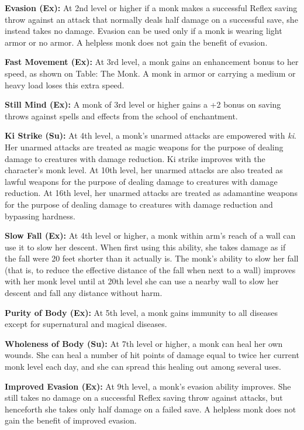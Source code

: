 \textbf{Evasion (Ex):} At 2nd level or higher if a monk makes a successful Reflex 
saving throw against an attack that normally deals half damage on a successful 
save, she instead takes no damage. Evasion can be used only if a monk is wearing 
light armor or no armor. A helpless monk does not gain the benefit of evasion.

\textbf{Fast Movement (Ex):} At 3rd level, a monk gains an enhancement bonus to 
her speed, as shown on Table: The Monk. A monk in armor or carrying a medium or 
heavy load loses this extra speed.

\textbf{Still Mind (Ex):} A monk of 3rd level or higher gains a +2 bonus on saving 
throws against spells and effects from the school of enchantment.

\textbf{Ki Strike (Su):} At 4th level, a monk's unarmed attacks 
are empowered with \textit{ki}. Her unarmed attacks are treated as magic weapons 
for the purpose of dealing damage to creatures with damage reduction. Ki 
strike improves with the character's monk level. At 10th level, her unarmed attacks 
are also treated as lawful weapons for the purpose of dealing damage to creatures 
with damage reduction. At 16th level, her unarmed attacks are treated as adamantine 
weapons for the purpose of dealing damage to creatures with damage reduction and 
bypassing hardness.

\textbf{Slow Fall (Ex):} At 4th level or higher, a monk within arm's reach of a 
wall can use it to slow her descent. When first using this ability, she takes damage 
as if the fall were 20 feet shorter than it actually is. The monk's ability to 
slow her fall (that is, to reduce the effective distance of the fall when next 
to a wall) improves with her monk level until at 20th level she can use a nearby 
wall to slow her descent and fall any distance without harm.

\textbf{Purity of Body (Ex):} At 5th level, a monk gains immunity to all diseases 
except for supernatural and magical diseases.

\textbf{Wholeness of Body (Su):} At 7th level or higher, a monk can heal her own 
wounds. She can heal a number of hit points of damage equal to twice her current 
monk level each day, and she can spread this healing out among several uses.

\textbf{Improved Evasion (Ex):} At 9th level, a monk's evasion ability improves. 
She still takes no damage on a successful Reflex saving throw against attacks, 
but henceforth she takes only half damage on a failed save. A helpless monk does 
not gain the benefit of improved evasion.

